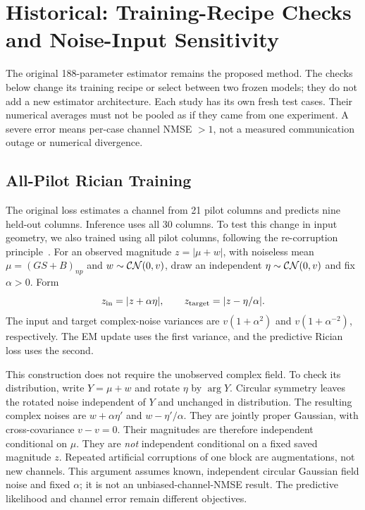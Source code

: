 \section{Historical: Training-Recipe Checks and Noise-Input Sensitivity}
\label{sec:training-updates}

The original 188-parameter estimator remains the proposed method. The
checks below change its training recipe or select between two frozen
models; they do not add a new estimator architecture. Each study has its
own fresh test cases. Their numerical averages must not be pooled as if
they came from one experiment. A severe error means per-case channel
NMSE $>1$, not a measured communication outage or numerical divergence.

\subsection{All-Pilot Rician Training}

The original loss estimates a channel from 21 pilot columns and predicts
nine held-out columns. Inference uses all 30 columns. To test this change
in input geometry, we also trained using all pilot columns, following
the re-corruption principle~\cite{pang2021r2r}. For an observed magnitude
$z=|\mu+w|$, with noiseless mean $\mu=(GS+B)_{np}$ and
$w\sim\mathcal{CN}(0,v)$, draw an independent
$\eta\sim\mathcal{CN}(0,v)$ and fix $\alpha>0$. Form
\begin{equation}
 z_{\rm in}=|z+\alpha\eta|,\qquad
 z_{\rm target}=|z-\eta/\alpha|.
\end{equation}
The input and target complex-noise variances are
$v(1+\alpha^2)$ and $v(1+\alpha^{-2})$, respectively. The EM update uses
the first variance, and the predictive Rician loss uses the second.

This construction does not require the unobserved complex field. To
check its distribution, write $Y=\mu+w$ and rotate $\eta$ by $\arg Y$.
Circular symmetry leaves the rotated noise independent of $Y$ and
unchanged in distribution. The resulting complex noises are
$w+\alpha\eta'$ and $w-\eta'/\alpha$. They are jointly proper Gaussian,
with cross-covariance $v-v=0$. Their magnitudes are therefore independent
conditional on $\mu$. They are \emph{not} independent conditional on a
fixed saved magnitude $z$. Repeated artificial corruptions of one block
are augmentations, not new channels. This argument assumes known,
independent circular Gaussian field noise and fixed $\alpha$; it is not
an unbiased-channel-NMSE result. The predictive likelihood and channel
error remain different objectives.

